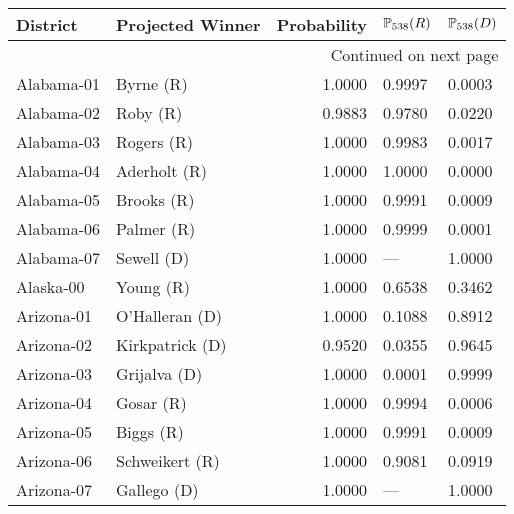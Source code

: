 \begin{longtable}{llrll}
\toprule
          District &                   Projected Winner &  Probability & $\P_{538}(R)$ & $\P_{538}(D)$ \\
\midrule
\endhead
\midrule
\multicolumn{5}{r}{{Continued on next page}} \\
\midrule
\endfoot

\bottomrule
\endlastfoot
        Alabama-01 &            {\color{Red} Byrne (R)} &       1.0000 &        0.9997 &        0.0003 \\
        Alabama-02 &             {\color{Red} Roby (R)} &       0.9883 &        0.9780 &        0.0220 \\
        Alabama-03 &           {\color{Red} Rogers (R)} &       1.0000 &        0.9983 &        0.0017 \\
        Alabama-04 &         {\color{Red} Aderholt (R)} &       1.0000 &        1.0000 &        0.0000 \\
        Alabama-05 &           {\color{Red} Brooks (R)} &       1.0000 &        0.9991 &        0.0009 \\
        Alabama-06 &           {\color{Red} Palmer (R)} &       1.0000 &        0.9999 &        0.0001 \\
        Alabama-07 &          {\color{Blue} Sewell (D)} &       1.0000 &           --- &        1.0000 \\
         Alaska-00 &            {\color{Red} Young (R)} &       1.0000 &        0.6538 &        0.3462 \\
        Arizona-01 &      {\color{Blue} O'Halleran (D)} &       1.0000 &        0.1088 &        0.8912 \\
        Arizona-02 &     {\color{Blue} Kirkpatrick (D)} &       0.9520 &        0.0355 &        0.9645 \\
        Arizona-03 &        {\color{Blue} Grijalva (D)} &       1.0000 &        0.0001 &        0.9999 \\
        Arizona-04 &            {\color{Red} Gosar (R)} &       1.0000 &        0.9994 &        0.0006 \\
        Arizona-05 &            {\color{Red} Biggs (R)} &       1.0000 &        0.9991 &        0.0009 \\
        Arizona-06 &       {\color{Red} Schweikert (R)} &       1.0000 &        0.9081 &        0.0919 \\
        Arizona-07 &         {\color{Blue} Gallego (D)} &       1.0000 &           --- &        1.0000 \\

\end{longtable}
